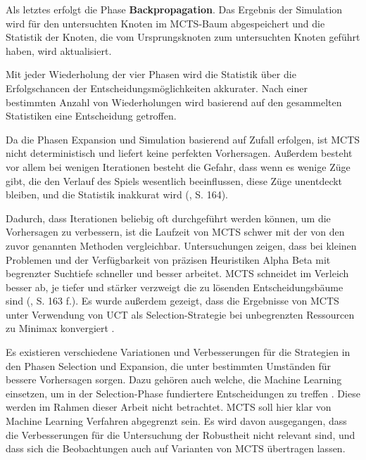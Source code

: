 Als letztes erfolgt die Phase \textbf{Backpropagation}. Das Ergebnis der Simulation wird für den untersuchten Knoten im MCTS-Baum abgespeichert und die Statistik der Knoten, die vom Ursprungsknoten zum untersuchten Knoten geführt haben, wird aktualisiert.

Mit jeder Wiederholung der vier Phasen wird die Statistik über die Erfolgschancen der Entscheidungsmöglichkeiten akkurater. Nach einer bestimmten Anzahl von Wiederholungen wird basierend auf den gesammelten Statistiken eine Entscheidung getroffen.

Da die Phasen Expansion und Simulation basierend auf Zufall erfolgen, ist MCTS nicht deterministisch und liefert keine perfekten Vorhersagen. Außerdem besteht vor allem bei wenigen Iterationen besteht die Gefahr, dass wenn es wenige Züge gibt, die den Verlauf des Spiels wesentlich beeinflussen, diese Züge unentdeckt bleiben, und die Statistik inakkurat wird (\cite{Russell.2020}, S. 164).

Dadurch, dass Iterationen beliebig oft durchgeführt werden können, um die Vorhersagen zu verbessern, ist die Laufzeit von MCTS schwer mit der von den zuvor genannten Methoden vergleichbar. Untersuchungen zeigen, dass bei kleinen Problemen und der Verfügbarkeit von präzisen Heuristiken Alpha Beta mit begrenzter Suchtiefe schneller und besser arbeitet. MCTS schneidet im Verleich besser ab, je tiefer und stärker verzweigt die zu lösenden Entscheidungsbäume sind (\cite{Russell.2020}, S. 163 f.). Es wurde außerdem gezeigt, dass die Ergebnisse von MCTS unter Verwendung von UCT als Selection-Strategie bei unbegrenzten Ressourcen zu Minimax konvergiert \cite{Browne.2012}.

Es existieren verschiedene Variationen und Verbesserungen für die Strategien in den Phasen Selection und Expansion, die unter bestimmten Umständen für bessere Vorhersagen sorgen. Dazu gehören auch welche, die Machine Learning einsetzen, um in der Selection-Phase fundiertere Entscheidungen zu treffen \cite{Browne.2012}. Diese werden im Rahmen dieser Arbeit nicht betrachtet. MCTS soll hier klar von Machine Learning Verfahren abgegrenzt sein. Es wird davon ausgegangen, dass die Verbesserungen für die Untersuchung der Robustheit nicht relevant sind, und dass sich die Beobachtungen auch auf Varianten von MCTS übertragen lassen.
